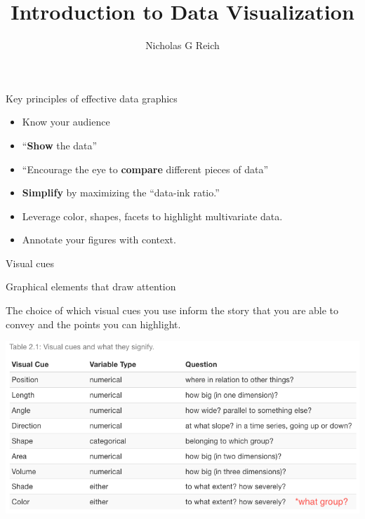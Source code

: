 \documentclass[table]{beamer}\usepackage[]{graphicx}\usepackage[]{xcolor}
\title{Introduction to Data Visualization}
\author{Nicholas G Reich}
\begin{document}
\begin{frame}[plain]
	\titlepage
\end{frame}






\begin{frame}{Key principles of effective data graphics}

\begin{itemize}
    \item Know your audience
    \item ``{\bf Show} the data''
    \item ``Encourage the eye to {\bf compare} different pieces of data''
    \item {\bf Simplify} by maximizing the ``data-ink ratio.''
    \item Leverage color, shapes, facets to highlight multivariate data.
    \item Annotate your figures with context.
\end{itemize}

\end{frame}



\begin{frame}[fragile]{Visual cues}
\begin{block}{Graphical elements that draw attention}

The choice of which visual cues you use inform the story that you are able to convey and the points you can highlight.

\end{block}

\includegraphics[width=\textwidth]{figure-static/visual-cues.png}

\end{frame}
\end{document}
